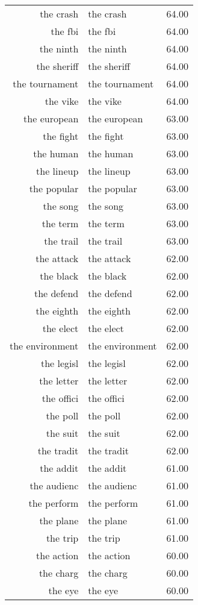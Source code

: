 \begin{table}[ht]
\begin{tabular}{rlr}
  the crash & the crash & 64.00 \\ 
  the fbi & the fbi & 64.00 \\ 
  the ninth & the ninth & 64.00 \\ 
  the sheriff & the sheriff & 64.00 \\ 
  the tournament & the tournament & 64.00 \\ 
  the vike & the vike & 64.00 \\ 
  the european & the european & 63.00 \\ 
  the fight & the fight & 63.00 \\ 
  the human & the human & 63.00 \\ 
  the lineup & the lineup & 63.00 \\ 
  the popular & the popular & 63.00 \\ 
  the song & the song & 63.00 \\ 
  the term & the term & 63.00 \\ 
  the trail & the trail & 63.00 \\ 
  the attack & the attack & 62.00 \\ 
  the black & the black & 62.00 \\ 
  the defend & the defend & 62.00 \\ 
  the eighth & the eighth & 62.00 \\ 
  the elect & the elect & 62.00 \\ 
  the environment & the environment & 62.00 \\ 
  the legisl & the legisl & 62.00 \\ 
  the letter & the letter & 62.00 \\ 
  the offici & the offici & 62.00 \\ 
  the poll & the poll & 62.00 \\ 
  the suit & the suit & 62.00 \\ 
  the tradit & the tradit & 62.00 \\ 
  the addit & the addit & 61.00 \\ 
  the audienc & the audienc & 61.00 \\ 
  the perform & the perform & 61.00 \\ 
  the plane & the plane & 61.00 \\ 
  the trip & the trip & 61.00 \\ 
  the action & the action & 60.00 \\ 
  the charg & the charg & 60.00 \\ 
  the eye & the eye & 60.00 \\ 

\end{tabular}
\end{table}
